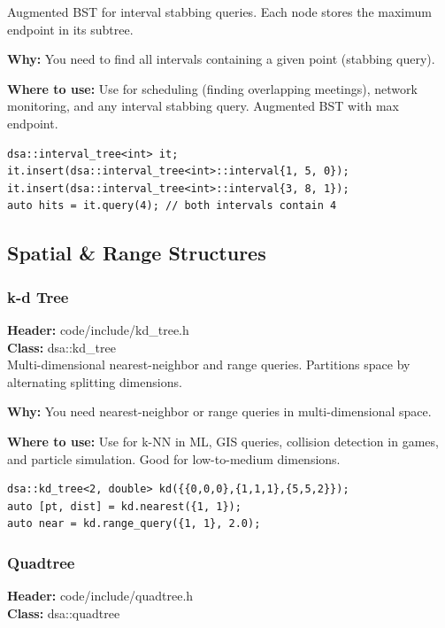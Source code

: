 \documentclass[11pt]{article}
\begin{document}
Augmented BST for interval stabbing queries. Each node stores the maximum endpoint in its subtree.

\textbf{Why:} You need to find all intervals containing a given point (stabbing query). \par \textbf{Where to use:} Use for scheduling (finding overlapping meetings), network monitoring, and any interval stabbing query. Augmented BST with max endpoint.

\begin{lstlisting}
dsa::interval_tree<int> it;
it.insert(dsa::interval_tree<int>::interval{1, 5, 0});
it.insert(dsa::interval_tree<int>::interval{3, 8, 1});
auto hits = it.query(4); // both intervals contain 4
\end{lstlisting}

\subsection{Spatial \& Range Structures}

\subsubsection{k-d Tree}
\textbf{Header:} code/include/kd\_tree.h\\
\textbf{Class:} dsa::kd\_tree\\

Multi-dimensional nearest-neighbor and range queries. Partitions space by alternating splitting dimensions.

\textbf{Why:} You need nearest-neighbor or range queries in multi-dimensional space. \par \textbf{Where to use:} Use for k-NN in ML, GIS queries, collision detection in games, and particle simulation. Good for low-to-medium dimensions.

\begin{lstlisting}
dsa::kd_tree<2, double> kd({{0,0,0},{1,1,1},{5,5,2}});
auto [pt, dist] = kd.nearest({1, 1});
auto near = kd.range_query({1, 1}, 2.0);
\end{lstlisting}

\subsubsection{Quadtree}
\textbf{Header:} code/include/quadtree.h\\
\textbf{Class:} dsa::quadtree\\
\end{document}
